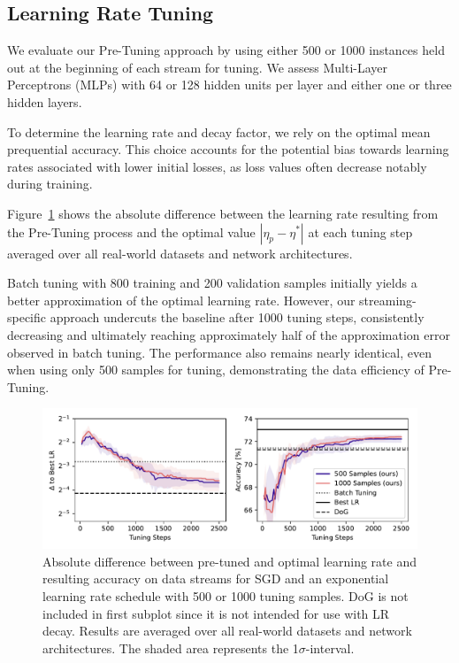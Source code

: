 \documentclass{article} %
\begin{document}
\subsection{Learning Rate Tuning}

We evaluate our Pre-Tuning approach by using either 500 or 1000 instances held out at the beginning of each stream for tuning. We assess Multi-Layer Perceptrons (MLPs) with 64 or 128 hidden units per layer and either one or three hidden layers.

To determine the learning rate and decay factor, we rely on the optimal mean prequential accuracy. This choice accounts for the potential bias towards learning rates associated with lower initial losses, as loss values often decrease notably during training.

Figure~\ref{fig:pretune_lr_accuracy} shows the absolute difference between the learning rate resulting from the Pre-Tuning process and the optimal value $|\eta_p - \eta^*|$ at each tuning step averaged over all real-world datasets and network architectures.

Batch tuning with 800 training and 200 validation samples initially yields a better approximation of the optimal learning rate. However, our streaming-specific approach undercuts the baseline after 1000 tuning steps, consistently decreasing and ultimately reaching approximately half of the approximation error observed in batch tuning.
The performance also remains nearly identical, even when using only 500 samples for tuning, demonstrating the data efficiency of Pre-Tuning.

\begin{figure}[hb]
   \centering
   \includegraphics[width=\textwidth]{figures/pretune_all_acc_lr_exp_schedule.pdf}
   \caption{Absolute difference between pre-tuned and optimal learning rate and resulting accuracy on data streams for SGD and an exponential learning rate schedule with 500 or 1000 tuning samples. DoG is not included in first subplot since it is not intended for use with LR decay. Results are averaged over all real-world datasets and network architectures. The shaded area represents the 1$\sigma$-interval.}\label{fig:pretune_lr_accuracy}
\end{figure}
\end{document}
